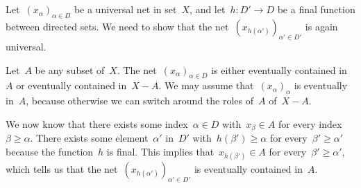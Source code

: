 \subsection{}

Let~$(x_α)_{α ∈ D}$ be a universal net in set~$X$, and let~$h \colon D' \to D$ be a final function between directed sets.
We need to show that the net~$(x_{h(α')})_{α' ∈ D'}$ is again universal.

Let~$A$ be any subset of~$X$.
The net~$(x_α)_{α ∈ D}$ is either eventually contained in~$A$ or eventually contained in~$X - A$.
We may assume that~$(x_α)_α$ is eventually in~$A$, because otherwise we can switch around the roles of~$A$ of~$X - A$.

We now know that there exists some index~$α ∈ D$ with~$x_β ∈ A$ for every index~$β ≥ α$.
There exists some element~$α'$ in~$D'$ with~$h(β') ≥ α$ for every~$β' ≥ α'$ because the function~$h$ is final.
This implies that~$x_{h(β')} ∈ A$ for every~$β' ≥ α'$, which tells us that the net~$(x_{h(α')})_{α' ∈ D'}$ is eventually contained in~$A$.

